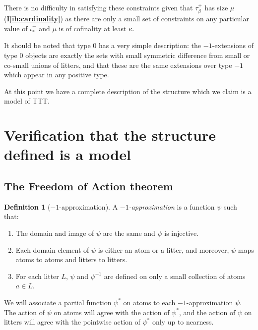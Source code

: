 \documentclass[112pt]{article}
\theoremstyle{definition}
\newtheorem{definition}[theorem]{Definition}
\theoremstyle{remark}
\newcommand{\ihref}[1]{(\textbf{I\ref{#1}})}
\newcommand{\hsuggest}[1]{{\color{magenta}#1}}
\begin{document}
There is no difficulty in satisfying these constraints {given that $\tau_\beta^+$ has size $\mu$ \ihref{ih:cardinality}} as there are only a small set of constraints on any particular value of $\iota_*^+$ and $\mu$ is of cofinality at least $\kappa$.



   It should be noted that type 0 has a very simple description:  the $-1$-extensions of type 0 objects are exactly the sets with small symmetric difference from small or co-small unions of litters, and that these are the same extensions over type $-1$ which appear in any positive type.


At this point we have a complete description of the structure which we claim is a model of TTT.

\begin{comment} was annot
  I think there's probably a slightly nicer way to talk about what \ihref{ih:position}, \ihref{ih:pos_typed_near_litter}, \ihref{ih:position_constraints} are doing here.
\end{comment}

\newpage

\section{Verification that the structure defined is a model}\label{s:verification}

\subsection{The Freedom of Action theorem}\label{ss:foa}

\begin{definition}[$-1$-approximation]\label{def:base_approx}
  A {\em $-1$-approximation\/} is a function $\psi$ such that:
  \begin{enumerate}
    \item The domain and image of $\psi$ are the same and $\psi$ is injective.
    \item Each domain element of $\psi$ is either an atom or a litter, and moreover, $\psi$ maps atoms to atoms and litters to litters.
    \item For each litter $L$, $\psi$ and $\psi^{-1}$ are defined on only a small collection of atoms $a \in L$.
  \end{enumerate}
\end{definition}
We will associate a partial function $\psi^*$ on atoms to each $-1$-approximation $\psi$.
The action of $\psi$ on atoms will agree with the action of $\psi^*$, and the action of $\psi$ on litters will agree with the pointwise action of $\psi^*$ only up to nearness.
\end{document}
